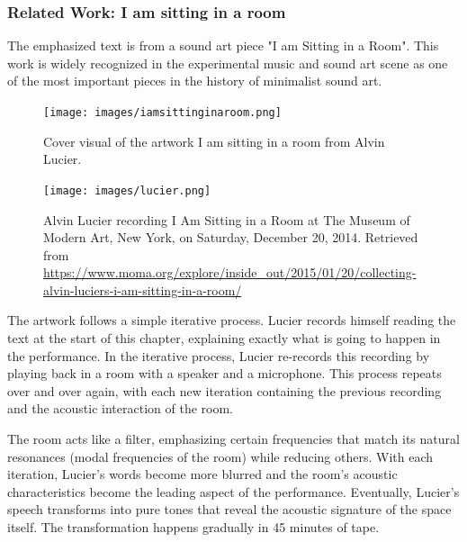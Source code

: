             \subsubsection{Related Work: I am sitting in a room}
        
                The emphasized text is from a sound art piece "I am Sitting in a Room". This work is widely recognized in the experimental music and sound art scene as one of the most important pieces in the history of minimalist sound art\cite{Lucier_phd}.\par

                \begin{figure}[H]
                    \centering
                    \texttt{[image: images/iamsittinginaroom.png]}
                    \caption{Cover visual of the artwork I am sitting in a room from Alvin Lucier.}
                    \label{fig:IASIAR}
                \end{figure}

                \begin{figure}[H]
                    \centering
                    \texttt{[image: images/lucier.png]}
                    \caption{Alvin Lucier recording I Am Sitting in a Room at The Museum of Modern Art, New York, on Saturday, December 20, 2014. Retrieved from \url{https://www.moma.org/explore/inside_out/2015/01/20/collecting-alvin-luciers-i-am-sitting-in-a-room/}}
                    \label{fig:LUCIER}
                \end{figure}            

                The artwork follows a simple iterative process. Lucier records himself reading the text at the start of this chapter, explaining exactly what is going to happen in the performance. In the iterative process, Lucier re-records this recording by playing back in a room with a speaker and a microphone. This process repeats over and over again, with each new iteration containing the previous recording and the acoustic interaction of the room\cite{Alvin_Lucier_I_am_Sitting_in_a_Room}.\par

                The room acts like a filter, emphasizing certain frequencies that match its natural resonances (modal frequencies of the room\cite{Room_Acoustics}) while reducing others. With each iteration, Lucier's words become more blurred and the room's acoustic characteristics become the leading aspect of the performance. Eventually, Lucier's speech transforms into pure tones that reveal the acoustic signature of the space itself. The transformation happens gradually in 45 minutes of tape\cite{MoMa_Lucier}.\par
                

